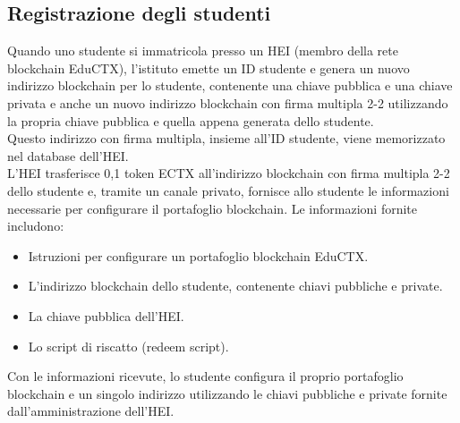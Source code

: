 \subsection{Registrazione degli studenti}
Quando uno studente si immatricola presso un HEI (membro della rete blockchain EduCTX), l'istituto emette un ID studente e genera un nuovo indirizzo blockchain per lo studente, contenente una chiave pubblica e una chiave privata
e anche un nuovo indirizzo blockchain con firma multipla 2-2 utilizzando la propria chiave pubblica e quella appena generata dello studente. 
\\Questo indirizzo con firma multipla, insieme all'ID studente, viene memorizzato nel database dell'HEI.
\\L'HEI trasferisce 0,1 token ECTX all'indirizzo blockchain con firma multipla 2-2 dello studente e, tramite un canale privato, fornisce allo studente le informazioni necessarie per configurare il portafoglio blockchain. 
\newpage
Le informazioni fornite includono:
\begin{itemize}
    \item Istruzioni per configurare un portafoglio blockchain EduCTX.
    \item L'indirizzo blockchain dello studente, contenente chiavi pubbliche e private.
    \item La chiave pubblica dell'HEI.
    \item Lo script di riscatto (redeem script).
\end{itemize}
Con le informazioni ricevute, lo studente configura il proprio portafoglio blockchain e un singolo indirizzo utilizzando le chiavi pubbliche e private fornite dall'amministrazione dell'HEI.
